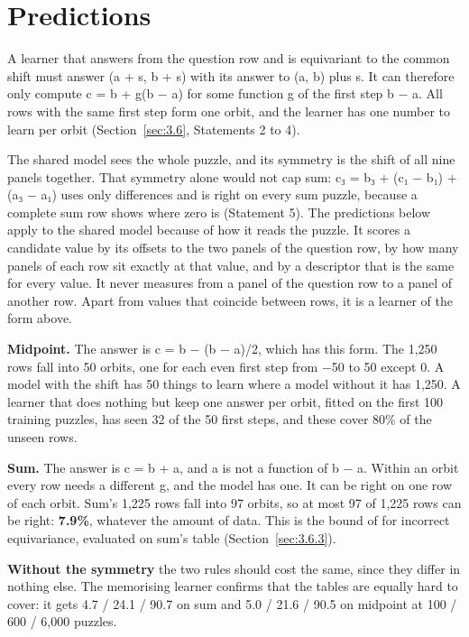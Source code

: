 \section{Predictions}\label{sec:7.3}

A learner that answers from the question row and is equivariant to the common shift must answer (a + s, b + s) with its answer to (a, b) plus s. It can therefore only compute c = b + g(b − a) for some function g of the first step b − a. All rows with the same first step form one orbit, and the learner has one number to learn per orbit (Section~\ref{sec:3.6}, Statements 2 to 4).

The shared model sees the whole puzzle, and its symmetry is the shift of all nine panels together. That symmetry alone would not cap sum: c₃ = b₃ + (c₁ − b₁) + (a₃ − a₁) uses only differences and is right on every sum puzzle, because a complete sum row shows where zero is (Statement 5). The predictions below apply to the shared model because of how it reads the puzzle. It scores a candidate value by its offsets to the two panels of the question row, by how many panels of each row sit exactly at that value, and by a descriptor that is the same for every value. It never measures from a panel of the question row to a panel of another row. Apart from values that coincide between rows, it is a learner of the form above.

\textbf{Midpoint.} The answer is c = b − (b − a)/2, which has this form. The 1,250 rows fall into 50 orbits, one for each even first step from −50 to 50 except 0. A model with the shift has 50 things to learn where a model without it has 1,250. A learner that does nothing but keep one answer per orbit, fitted on the first 100 training puzzles, has seen 32 of the 50 first steps, and these cover 80\% of the unseen rows.

\textbf{Sum.} The answer is c = b + a, and a is not a function of b − a. Within an orbit every row needs a different g, and the model has one. It can be right on one row of each orbit. Sum's 1,225 rows fall into 97 orbits, so at most 97 of 1,225 rows can be right: \textbf{7.9\%}, whatever the amount of data. This is the bound of \citet[Theorem 4.3]{wang2023general} for incorrect equivariance, evaluated on sum's table (Section~\ref{sec:3.6.3}).

\textbf{Without the symmetry} the two rules should cost the same, since they differ in nothing else. The memorising learner confirms that the tables are equally hard to cover: it gets 4.7 / 24.1 / 90.7 on sum and 5.0 / 21.6 / 90.5 on midpoint at 100 / 600 / 6,000 puzzles.

